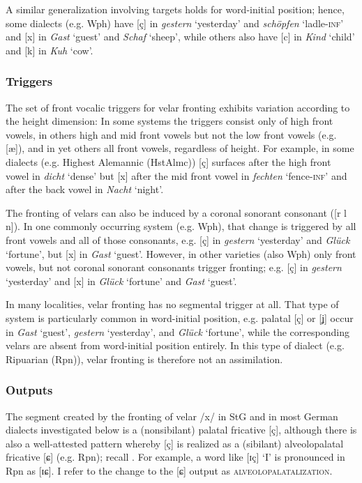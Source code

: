 \begin{sloppypar}
A similar generalization involving targets holds for word-initial position; hence, some dialects (e.g. Wph) have [ç] in \textit{gestern} ‘yesterday’ and \textit{schöpfen} ‘ladle-\textsc{inf}’ and [x] in \textit{Gast} ‘guest’ and \textit{Schaf} ‘sheep’, while others also have [c] in \textit{Kind} ‘child’ and [k] in \textit{Kuh} ‘cow’.
\end{sloppypar}

\subsubsection{Triggers} The set of front vocalic triggers for velar fronting exhibits variation according to the height dimension: In some systems the triggers consist only of high front vowels, in others high and mid front vowels but not the low front vowels (e.g. [æ]), and in yet others all front vowels, regardless of height. For example, in some dialects (e.g. Highest Alemannic (HstAlmc)) [ç] surfaces after the high front vowel in \textit{dicht} ‘dense’ but [x] after the mid front vowel in \textit{fechten} ‘fence-\textsc{inf}’ and after the back vowel in \textit{Nacht} ‘night’.

The fronting of velars can also be induced by a coronal sonorant consonant ([r l n]). In one commonly occurring system (e.g. Wph), that change is triggered by all front vowels and all of those consonants, e.g. [ç] in \textit{gestern} ‘yesterday’ and \textit{Glück} ‘fortune’, but [x] in \textit{Gast} ‘guest’. However, in other varieties (also Wph) only front vowels, but not coronal sonorant consonants trigger fronting; e.g. [ç] in \textit{gestern} ‘yesterday’ and [x] in \textit{Glück} ‘fortune’ and \textit{Gast} ‘guest’.

In many localities, velar fronting has no segmental trigger at all. That type of system is particularly common in word-initial position, e.g. palatal [ç] or [ʝ] occur in \textit{Gast} ‘guest’, \textit{gestern} ‘yesterday’, and \textit{Glück} ‘fortune’, while the corresponding velars are absent from word-initial position entirely. In this type of dialect (e.g. Ripuarian (Rpn)), velar fronting is therefore not an assimilation.

\subsubsection{Outputs} The segment created by the fronting of velar /x/ in StG and in most German dialects investigated below is a (nonsibilant) palatal fricative [ç], although there is also a well-attested pattern whereby [ç] is realized as a (sibilant) alveolopalatal fricative [ɕ] (e.g. Rpn); recall . For example, a word like [ɪç] ‘I’ is pronounced in Rpn as [ɪɕ]. I refer to the change to the [ɕ] output as \textsc{alveolopalatalization}.


